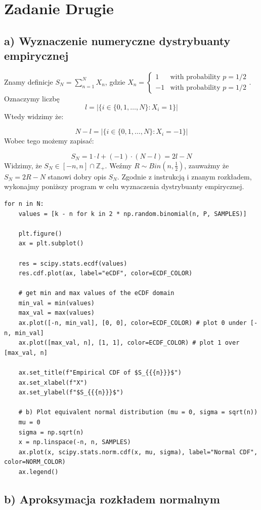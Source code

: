 \documentclass{article}
\begin{document}
\section{Zadanie Drugie}

\subsection{a) Wyznaczenie numeryczne dystrybuanty empirycznej}

Znamy definicje $S_N = \sum_{n=1}^{N} X_n$, gdzie
$X_n = \begin{cases} 1 & \text{with probability } p = 1/2 \\ -1 & \text{with probability } p = 1/2 \end{cases}$.\\
Oznaczymy liczbę 
\[
l=|\{i\in\{0,1,\dots,N\}: X_i=1\}|
\]
Wtedy widzimy że:

\[
N-l=|\{i\in\{0,1,\dots,N\}: X_i=-1\}|
\]
Wobec tego możemy zapisać:

\[
S_N = 1 \cdot l + (-1) \cdot (N-l) = 2l - N 
\]
Widzimy, że $S_N\in[-n,n]\cap \mathbb{Z_{+}}$. Weźmy $R\sim Bin\left(n,\frac{1}{2}\right)$, zauważmy że
$S_N = 2R-N$ stanowi dobry opis $S_N$. Zgodnie z instrukcją i znanym rozkładem, wykonajmy poniższy program w celu wyznaczenia dystrybuanty empirycznej.

\begin{verbatim}
for n in N:
    values = [k - n for k in 2 * np.random.binomial(n, P, SAMPLES)]

    plt.figure()
    ax = plt.subplot()
    
    res = scipy.stats.ecdf(values)
    res.cdf.plot(ax, label="eCDF", color=ECDF_COLOR)
    
    # get min and max values of the eCDF domain
    min_val = min(values)    
    max_val = max(values)
    ax.plot([-n, min_val], [0, 0], color=ECDF_COLOR) # plot 0 under [-n, min_val]
    ax.plot([max_val, n], [1, 1], color=ECDF_COLOR) # plot 1 over [max_val, n]

    ax.set_title(f"Empirical CDF of $S_{{{n}}}$")
    ax.set_xlabel(f"X")
    ax.set_ylabel(f"$S_{{{n}}}$")

    # b) Plot equivalent normal distribution (mu = 0, sigma = sqrt(n))
    mu = 0
    sigma = np.sqrt(n)
    x = np.linspace(-n, n, SAMPLES)
    ax.plot(x, scipy.stats.norm.cdf(x, mu, sigma), label="Normal CDF", color=NORM_COLOR)
    ax.legend()
\end{verbatim}

\subsection{b) Aproksymacja rozkładem normalnym}
\end{document}
